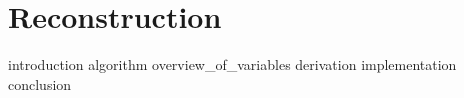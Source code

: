 \documentclass[a4paper, openany, oneside]{memoir}
\begin{document}
\chapter{Reconstruction}
\label{cha:reconstruction}

{introduction}
{algorithm}
{overview_of_variables}
{derivation}
{implementation}
{conclusion}
\end{document}
